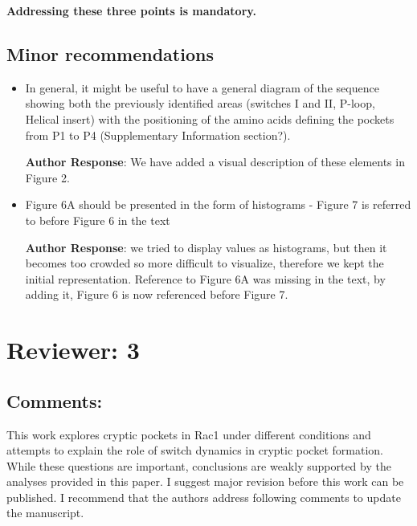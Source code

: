 \documentclass[11pt, a4paper]{article}
\begin{document}
\textbf{Addressing these three points is mandatory.}

\subsection{Minor recommendations}
\begin{itemize}
    \item In general, it might be useful to have a general diagram of the sequence showing both the previously identified areas (switches I and II, P-loop, Helical insert) with the positioning of the amino acids defining the pockets from P1 to P4 (Supplementary Information section?).

\textbf{Author Response}: We have added a visual description of these elements in Figure 2.
    
    \item Figure 6A should be presented in the form of histograms - Figure 7 is referred to before Figure 6 in the text

\textbf{Author Response}: we tried to display values as histograms, but then it becomes too crowded so more difficult to visualize, therefore we kept the initial representation. Reference to Figure 6A was missing in the text, by adding it, Figure 6 is now referenced before Figure 7.

\end{itemize}


\section{Reviewer: 3}

\subsection{Comments:}
This work explores cryptic pockets in Rac1 under different conditions and attempts to explain the role of switch dynamics in cryptic pocket formation. While these questions are important, conclusions are weakly supported by the analyses provided in this paper. I suggest major revision before this work can be published. I recommend that the authors address following comments to update the manuscript.
\end{document}
